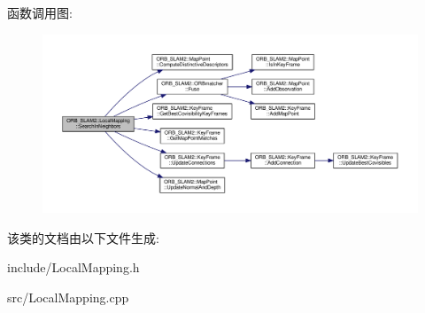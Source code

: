 函数调用图\-:
\nopagebreak
\begin{figure}[H]
\begin{center}
\leavevmode
\includegraphics[width=350pt]{classORB__SLAM2_1_1LocalMapping_a5d5e0bc6fd15d9a6bf1ca8a258f104f1_cgraph}
\end{center}
\end{figure}




该类的文档由以下文件生成\-:\begin{DoxyCompactItemize}
\item 
include/Local\-Mapping.\-h\item 
src/Local\-Mapping.\-cpp\end{DoxyCompactItemize}
